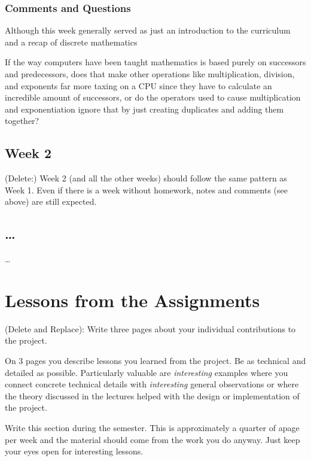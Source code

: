 \documentclass{article}
\theoremstyle{theorem}
\theoremstyle{definition}
\theoremstyle{remark}
\begin{document}
\subsubsection*{Comments and Questions}

Although this week generally served as just an introduction to the curriculum and a recap of discrete mathematics 

If the way computers have been taught mathematics is based purely on successors and predecessors, does that make other operations like multiplication, division, and exponents far more taxing on a CPU since they have to calculate an incredible amount of successors, or do the operators used to cause multiplication and exponentiation ignore that by just creating duplicates and adding them together?


\subsection{Week 2}

(Delete:) Week 2 (and all the other weeks) should follow the same pattern as Week 1. Even if there is a week without homework, notes and comments (see above) are still expected.

\subsection{\ldots}

\ldots

\section{Lessons from the Assignments}

(Delete and Replace): Write three pages about your individual contributions to the project.

On 3 pages you describe lessons you learned from the project. Be as technical and detailed as possible. Particularly valuable are \emph{interesting} examples where you connect concrete technical details with \emph{interesting} general observations or where the theory discussed in the lectures helped with the design or implementation of the project.

Write this section during the semester. This is approximately a quarter of apage per week and the material should come from the work you do anyway. Just keep your eyes open for interesting lessons.
\end{document}
